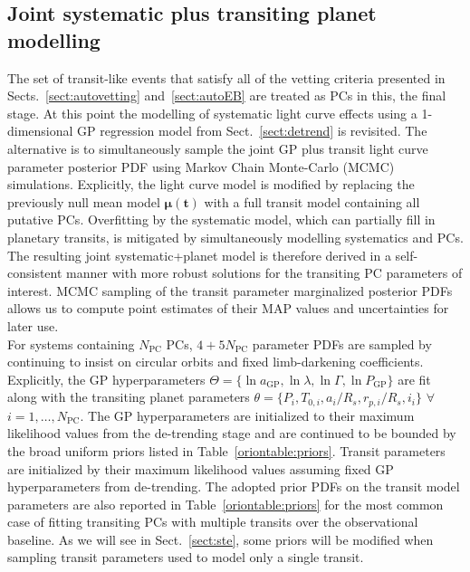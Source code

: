 \subsection{Joint systematic plus transiting planet modelling} \label{sect:joint}
The set of transit-like events that satisfy all of the vetting criteria
presented in Sects.~\ref{sect:autovetting} and~\ref{sect:autoEB} are treated
as PCs in this, the final \pipeline{} stage. At this point the modelling of systematic
light curve effects using a 1-dimensional GP regression model from Sect.~\ref{sect:detrend}
is revisited. The alternative is to simultaneously sample the joint GP plus transit light curve
parameter posterior PDF using Markov Chain Monte-Carlo (MCMC) simulations.
Explicitly, the light curve model is modified by replacing the previously null mean model
$\boldsymbol{\mu}(\mathbf{t})$ with a full transit model containing all putative PCs. 
Overfitting by the systematic model, which can partially fill in planetary
transits, is mitigated by simultaneously modelling systematics and PCs.
The resulting joint systematic+planet model is therefore derived in a self-consistent
manner with more robust solutions for the transiting PC parameters of interest.
MCMC sampling of the transit parameter marginalized posterior PDFs allows us to compute
point estimates of their MAP values and uncertainties for later use. \\

For systems containing $N_{\text{PC}}$ PCs, $4+5N_{\text{PC}}$ parameter PDFs are sampled
by continuing to insist on circular orbits and fixed limb-darkening coefficients.
Explicitly, the GP
hyperparameters $\Theta = \{\ln{a_{\text{GP}}},\ln{\lambda},\ln{\Gamma},\ln{P_{\text{GP}}}\}$
are fit along with the
transiting planet parameters $\theta = \{P_i,T_{0,i},a_i/R_s,r_{p,i}/R_s,i_i \}$
$\forall$ $i=1,\dots,N_{\text{PC}}$. The GP hyperparameters are initialized to their maximum
likelihood values from the de-trending stage and are continued to be bounded by the broad
uniform priors listed in Table~\ref{oriontable:priors}. Transit parameters are
initialized by their maximum likelihood values assuming fixed GP hyperparameters from
de-trending. The adopted prior PDFs on the transit model parameters are also reported
in Table~\ref{oriontable:priors} for the most common case of fitting transiting PCs with
multiple transits over the observational baseline.
As we will see in Sect.~\ref{sect:ste}, some priors will be modified when sampling transit
parameters used to model only a single transit.  \\


